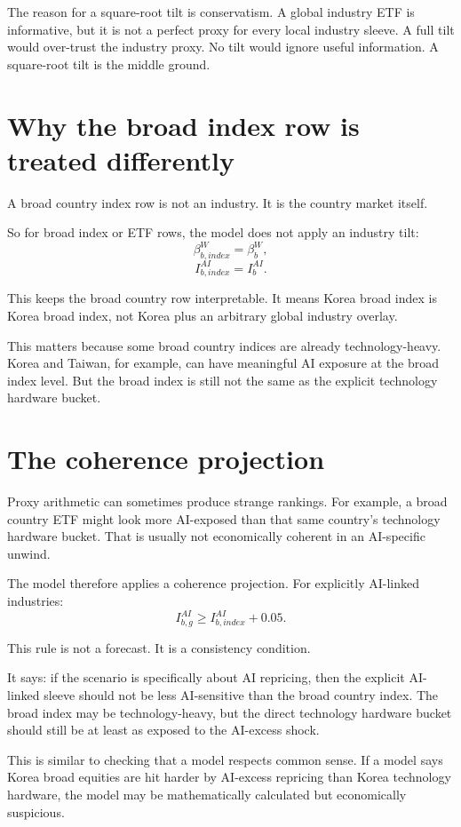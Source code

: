 \documentclass[10pt]{article}
\begin{document}
The reason for a square-root tilt is conservatism. A global industry ETF is informative, but it is not a perfect proxy for every local industry sleeve. A full tilt would over-trust the industry proxy. No tilt would ignore useful information. A square-root tilt is the middle ground.

\section{Why the broad index row is treated differently}

A broad country index row is not an industry. It is the country market itself.

So for broad index or ETF rows, the model does not apply an industry tilt:
\[
\beta_{b,index}^{W}=\beta_b^W,
\]
\[
I_{b,index}^{AI}=I_b^{AI}.
\]

This keeps the broad country row interpretable. It means Korea broad index is Korea broad index, not Korea plus an arbitrary global industry overlay.

This matters because some broad country indices are already technology-heavy. Korea and Taiwan, for example, can have meaningful AI exposure at the broad index level. But the broad index is still not the same as the explicit technology hardware bucket.

\section{The coherence projection}

Proxy arithmetic can sometimes produce strange rankings. For example, a broad country ETF might look more AI-exposed than that same country's technology hardware bucket. That is usually not economically coherent in an AI-specific unwind.

The model therefore applies a coherence projection. For explicitly AI-linked industries:
\[
I_{b,g}^{AI}\geq I_{b,index}^{AI}+0.05.
\]

This rule is not a forecast. It is a consistency condition.

It says: if the scenario is specifically about AI repricing, then the explicit AI-linked sleeve should not be less AI-sensitive than the broad country index. The broad index may be technology-heavy, but the direct technology hardware bucket should still be at least as exposed to the AI-excess shock.

This is similar to checking that a model respects common sense. If a model says Korea broad equities are hit harder by AI-excess repricing than Korea technology hardware, the model may be mathematically calculated but economically suspicious.
\end{document}
